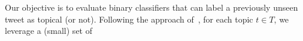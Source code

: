 


Our objective is to evaluate binary classifiers that can label
a previously unseen tweet as topical (or not).
%
%
%
Following
the approach of~\cite{lin2011smoothing}, for each topic $t \in T$, we leverage a (small) set of
